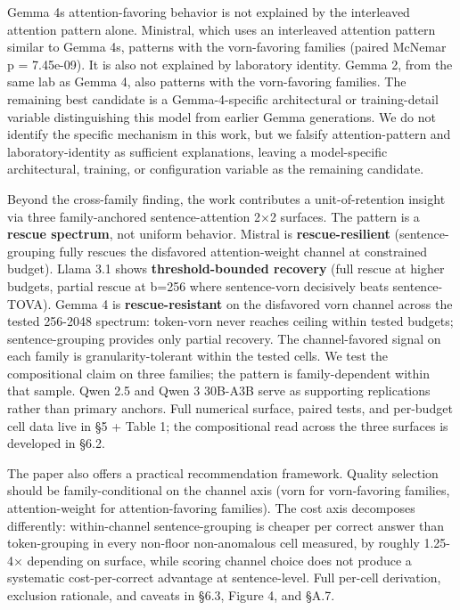 \documentclass[
]{article}
\begin{document}
Gemma 4\textquotesingle s attention-favoring behavior is not explained
by the interleaved attention pattern alone. Ministral, which uses an interleaved attention pattern
similar to Gemma 4\textquotesingle s, patterns with the
vorn-favoring families (paired McNemar p = 7.45e-09). It
is also not explained by laboratory identity. Gemma 2, from the same
lab as Gemma 4, also patterns with the vorn-favoring
families. The remaining best candidate is a Gemma-4-specific
architectural or training-detail variable distinguishing this model from
earlier Gemma generations. We do not identify the specific mechanism in
this work, but we falsify attention-pattern and laboratory-identity as
sufficient explanations, leaving a model-specific architectural,
training, or configuration variable as the remaining candidate.

Beyond the cross-family finding, the work contributes a
unit-of-retention insight via three family-anchored sentence-attention
2×2 surfaces. The pattern is a \textbf{rescue spectrum}, not uniform
behavior. Mistral is \textbf{rescue-resilient} (sentence-grouping fully
rescues the disfavored attention-weight channel at constrained budget).
Llama 3.1 shows \textbf{threshold-bounded recovery} (full rescue at
higher budgets, partial rescue at b=256 where sentence-vorn decisively
beats sentence-TOVA). Gemma 4 is
\textbf{rescue-resistant} on the disfavored vorn channel across the
tested 256-2048 spectrum: token-vorn never reaches ceiling within tested
budgets; sentence-grouping provides only partial recovery. The
channel-favored signal on each family is granularity-tolerant within the
tested cells. We test the compositional claim on three families; the
pattern is family-dependent within that sample. Qwen 2.5 and
Qwen 3 30B-A3B serve as supporting replications rather than primary
anchors. Full numerical surface,
paired tests, and per-budget cell data live in §5 + Table 1; the
compositional read across the three surfaces is developed in §6.2.

The paper also offers a practical recommendation framework. Quality
selection should be family-conditional on the channel axis (vorn for
vorn-favoring families, attention-weight for attention-favoring
families). The cost axis decomposes differently: within-channel
sentence-grouping is cheaper per correct answer than token-grouping in
every non-floor non-anomalous cell measured, by roughly 1.25-4×
depending on surface, while scoring channel choice does not produce
a systematic cost-per-correct advantage at sentence-level. Full per-cell derivation, exclusion
rationale, and caveats in §6.3, Figure 4, and §A.7.
\end{document}
